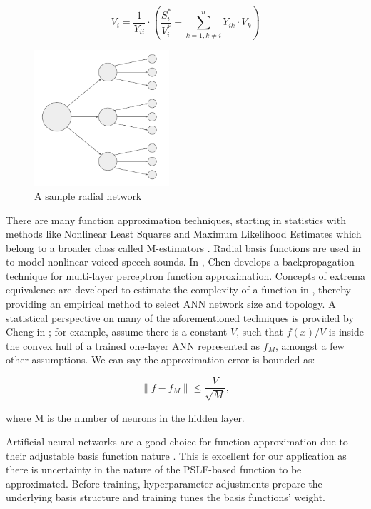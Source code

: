 \documentclass[conference]{IEEEtran}
\begin{document}
\begin{equation} V_i = \frac{1}{Y_{ii}} \cdot \left(\frac{S_i^*}{V_i^*} - \displaystyle\sum_{k=1,k \neq i}^{n} Y_{ik} \cdot V_k\right) \label{form:nlpfeqn} \end{equation}

\begin{figure}[h]
	\centering
	\includegraphics[width=5cm]{radialnetwork.pdf}
	\caption{A sample radial network}
	\label{fig:radnetwork}
\end{figure}

There are many function approximation techniques, starting in statistics with methods like Nonlinear Least Squares and Maximum Likelihood Estimates which belong to a broader class called M-estimators \cite{haya2000}. Radial basis functions are used in \cite{mann1999} to model nonlinear voiced speech sounds. In \cite{chen1994}, Chen develops a backpropagation technique for multi-layer perceptron function approximation. Concepts of extrema equivalence are developed to estimate the complexity of a function in \cite{zhang2004}, thereby providing an empirical method to select ANN network size and topology. A statistical perspective on many of the aforementioned techniques is provided by Cheng in \cite{cheng1994}; for example, assume there is a constant $V$, such that $f(x)/V$ is inside the convex hull of a trained one-layer ANN represented as $f_{M}$, amongst a few other assumptions. We can say the approximation error is bounded as:

\begin{equation} \|f - f_{M}\| \leqslant \frac{V}{\sqrt{M}}, \label{form:1layerannbound} \end{equation}

\noindent where M is the number of neurons in the hidden layer.

Artificial neural networks are a good choice for function approximation due to their adjustable basis function nature \cite{barr1994}. This is excellent for our application as there is uncertainty in the nature of the PSLF-based function to be approximated. Before training, hyperparameter adjustments prepare the underlying basis structure and training tunes the basis functions' weight.
\end{document}
